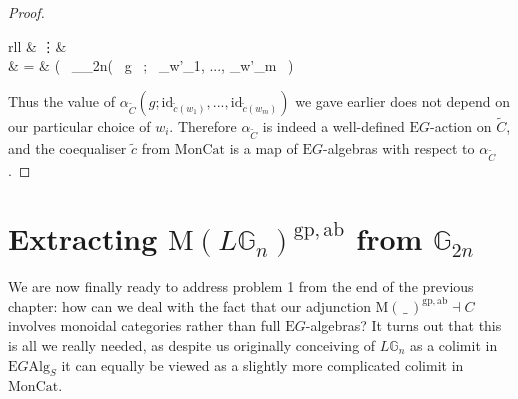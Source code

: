 \begin{proof}
\begin{eq*}
\begin{array}{rll}
			& \vdots & \\
			& = & \big( \, \alpha_{_{2n}}( \, g \, ; \, _{w'_1}, ..., _{w'_m} \, ) 
		\end{array} 
\end{eq*}
Thus the value of $\alpha_{\tilde{C}}(g; \mathrm{id}_{\tilde{c}(w_1)}, ..., \mathrm{id}_{\tilde{c}(w_m)})$ we gave earlier does not depend on our particular choice of $w_i$. Therefore $\alpha_{\tilde{C}}$ is indeed a well-defined $\mathrm{E}G$-action on $\tilde{C}$, and the coequaliser $\tilde{c}$ from $\mathrm{MonCat}$ is a map of $\mathrm{E}G$-algebras with respect to $\alpha_{\tilde{C}}$.
\end{proof}

\section{Extracting $\mathrm{M}(L\mathbb{G}_n)^{\mathrm{gp},\mathrm{ab}}$ from $\mathbb{G}_{2n}$}

We are now finally ready to address problem 1 from the end of the previous chapter: how can we deal with the fact that our adjunction $\mathrm{M}(\, \_ \,)^{\mathrm{gp},\mathrm{ab}} \dashv C$ involves monoidal categories rather than full $\mathrm{E}G$-algebras? It turns out that this is all we really needed, as despite us originally conceiving of $L\mathbb{G}_n$ as a colimit in $\mathrm{E}G\mathrm{Alg}_S$ it can equally be viewed as a slightly more complicated colimit in $\mathrm{MonCat}$.

